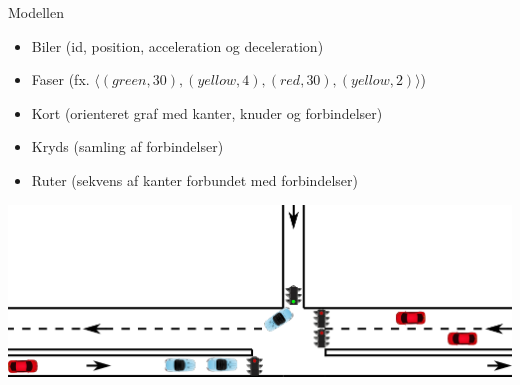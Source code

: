 \begin{frame}{Modellen}
\begin{itemize}
\item Biler (id, position, acceleration og deceleration)
\item Faser (fx. $\langle(green, 30), (yellow, 4), (red, 30), (yellow, 2)\rangle$)
\item Kort (orienteret graf med kanter, knuder og forbindelser)
\item Kryds (samling af forbindelser)
\item Ruter (sekvens af kanter forbundet med forbindelser)
\end{itemize}

\includegraphics[width=1\textwidth]{../images/introNetworkSimple.png}
\end{frame}
